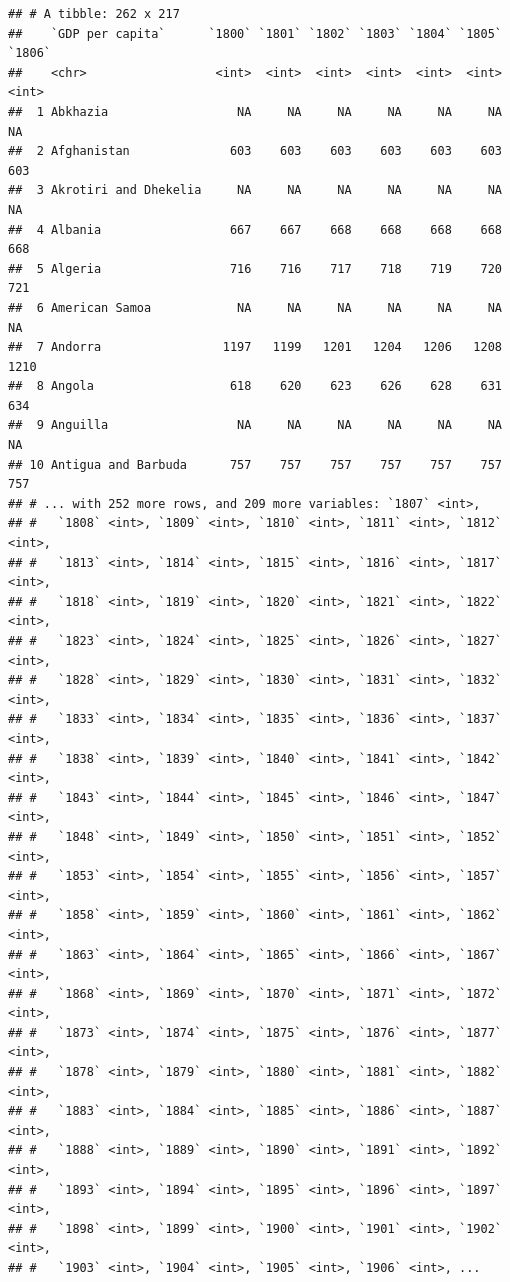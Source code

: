 \documentclass[]{book}
\theoremstyle{definition}
\theoremstyle{definition}
\theoremstyle{definition}
\theoremstyle{remark}
\begin{document}
\begin{verbatim}
## # A tibble: 262 x 217
##    `GDP per capita`      `1800` `1801` `1802` `1803` `1804` `1805` `1806`
##    <chr>                  <int>  <int>  <int>  <int>  <int>  <int>  <int>
##  1 Abkhazia                  NA     NA     NA     NA     NA     NA     NA
##  2 Afghanistan              603    603    603    603    603    603    603
##  3 Akrotiri and Dhekelia     NA     NA     NA     NA     NA     NA     NA
##  4 Albania                  667    667    668    668    668    668    668
##  5 Algeria                  716    716    717    718    719    720    721
##  6 American Samoa            NA     NA     NA     NA     NA     NA     NA
##  7 Andorra                 1197   1199   1201   1204   1206   1208   1210
##  8 Angola                   618    620    623    626    628    631    634
##  9 Anguilla                  NA     NA     NA     NA     NA     NA     NA
## 10 Antigua and Barbuda      757    757    757    757    757    757    757
## # ... with 252 more rows, and 209 more variables: `1807` <int>,
## #   `1808` <int>, `1809` <int>, `1810` <int>, `1811` <int>, `1812` <int>,
## #   `1813` <int>, `1814` <int>, `1815` <int>, `1816` <int>, `1817` <int>,
## #   `1818` <int>, `1819` <int>, `1820` <int>, `1821` <int>, `1822` <int>,
## #   `1823` <int>, `1824` <int>, `1825` <int>, `1826` <int>, `1827` <int>,
## #   `1828` <int>, `1829` <int>, `1830` <int>, `1831` <int>, `1832` <int>,
## #   `1833` <int>, `1834` <int>, `1835` <int>, `1836` <int>, `1837` <int>,
## #   `1838` <int>, `1839` <int>, `1840` <int>, `1841` <int>, `1842` <int>,
## #   `1843` <int>, `1844` <int>, `1845` <int>, `1846` <int>, `1847` <int>,
## #   `1848` <int>, `1849` <int>, `1850` <int>, `1851` <int>, `1852` <int>,
## #   `1853` <int>, `1854` <int>, `1855` <int>, `1856` <int>, `1857` <int>,
## #   `1858` <int>, `1859` <int>, `1860` <int>, `1861` <int>, `1862` <int>,
## #   `1863` <int>, `1864` <int>, `1865` <int>, `1866` <int>, `1867` <int>,
## #   `1868` <int>, `1869` <int>, `1870` <int>, `1871` <int>, `1872` <int>,
## #   `1873` <int>, `1874` <int>, `1875` <int>, `1876` <int>, `1877` <int>,
## #   `1878` <int>, `1879` <int>, `1880` <int>, `1881` <int>, `1882` <int>,
## #   `1883` <int>, `1884` <int>, `1885` <int>, `1886` <int>, `1887` <int>,
## #   `1888` <int>, `1889` <int>, `1890` <int>, `1891` <int>, `1892` <int>,
## #   `1893` <int>, `1894` <int>, `1895` <int>, `1896` <int>, `1897` <int>,
## #   `1898` <int>, `1899` <int>, `1900` <int>, `1901` <int>, `1902` <int>,
## #   `1903` <int>, `1904` <int>, `1905` <int>, `1906` <int>, ...
\end{verbatim}
\end{document}
